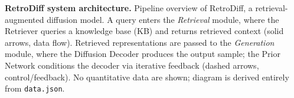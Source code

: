 \caption{\textbf{RetroDiff system architecture.} Pipeline overview of RetroDiff, a retrieval-augmented diffusion model. A query enters the \textit{Retrieval} module, where the Retriever queries a knowledge base (KB) and returns retrieved context (solid arrows, data flow). Retrieved representations are passed to the \textit{Generation} module, where the Diffusion Decoder produces the output sample; the Prior Network conditions the decoder via iterative feedback (dashed arrows, control/feedback). No quantitative data are shown; diagram is derived entirely from \texttt{data.json}.}
